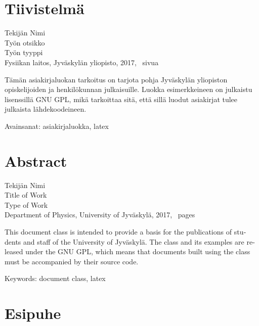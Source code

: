 \documentclass[final, finnished, monochromatic]{jyuthesis}
\newcommand \jyuauthor{Tekijän Nimi}
\newcommand \jyuauthorfinnish \jyuauthor
\newcommand \jyutitle{Title of Work}
\newcommand \jyutitlefinnish{Työn otsikko}
\newcommand \jyupublication{Type of Work}
\newcommand \jyupublicationfinnish{Työn tyyppi}
\newcommand \jyuinstitute{University of Jyväskylä}
\newcommand \jyuinstitutefinnish{Jyväskylän yliopisto}
\newcommand \jyudepartment{Department of Physics}
\newcommand \jyudepartmentfinnish{Fysiikan laitos}
\newcommand \jyuyear{2017}
\begin{document}
\maketitle

\section*{Tiivistelmä}

\noindent
\jyuauthorfinnish \\
\jyutitlefinnish \\
\jyupublicationfinnish \\
\jyudepartmentfinnish, \jyuinstitutefinnish, \jyuyear,
\pageref{p/lastpage}~sivua

\bigskip

\noindent
Tämän asiakirjaluokan tarkoitus on tarjota pohja
Jyväskylän yliopiston opiskelijoiden ja henkilökunnan julkaisuille.
Luokka esimerkkeineen on julkaistu lisenssillä GNU GPL, mikä tarkoittaa sitä,
että sillä luodut asiakirjat tulee julkaista lähdekoodeineen.

\bigskip

\noindent Avainsanat: asiakirjaluokka, latex

\section*{Abstract}

\noindent
\jyuauthor \\
\jyutitle \\
\jyupublication \\
\jyudepartment, \jyuinstitute, \jyuyear,
\pageref{p/lastpage}~pages

\bigskip

\begin{otherlanguage}{english}
  \noindent
  This document class is intended to provide a basis
  for the publications of students and staff of the University of Jyväskylä.
  The class and its examples are released under the GNU GPL, which means that
  documents built using the class must be accompanied by their source code.
\end{otherlanguage}

\bigskip

\noindent Keywords: document class, latex

\section*{Esipuhe}
\end{document}

